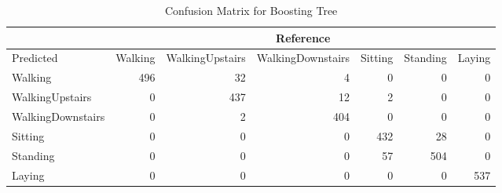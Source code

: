 \begin{table}[ht]
\begin{adjustwidth}{-1in}{-1in}
\centering
\caption{Confusion Matrix for Boosting Tree} 
\label{tab:conmat_boost}
\begin{tabular}{l|rrrrrr}
  &\multicolumn{6}{c}{Reference}\\
 \hline
Predicted & Walking & WalkingUpstairs & WalkingDownstairs & Sitting & Standing & Laying \\ 
  \hline
Walking & 496 &  32 &   4 &   0 &   0 &   0 \\ 
  WalkingUpstairs &   0 & 437 &  12 &   2 &   0 &   0 \\ 
  WalkingDownstairs &   0 &   2 & 404 &   0 &   0 &   0 \\ 
  Sitting &   0 &   0 &   0 & 432 &  28 &   0 \\ 
  Standing &   0 &   0 &   0 &  57 & 504 &   0 \\ 
  Laying &   0 &   0 &   0 &   0 &   0 & 537 \\ 
   \hline
\end{tabular}
\end{adjustwidth}
\end{table}
